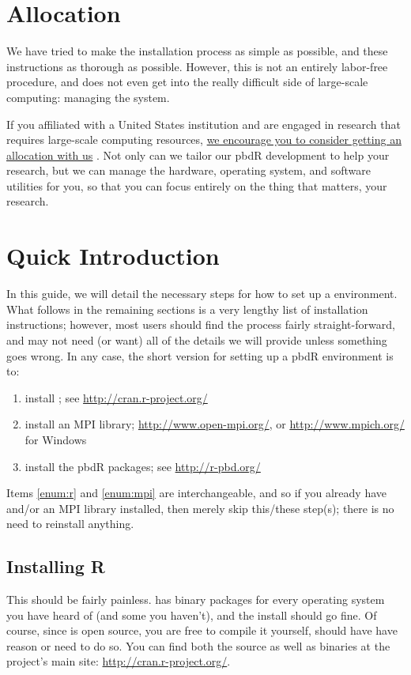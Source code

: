 \section{Allocation}
We have tried to make the installation process as simple as possible, and these instructions as thorough as possible.  However, this is not an entirely labor-free procedure, and does not even get into the really difficult side of large-scale computing:  managing the system.  

If you affiliated with a United States institution and are engaged in research that requires large-scale computing resources, \href{http://www.nics.tennessee.edu/getting-an-allocation}{we encourage you to consider getting an allocation with us} .  Not only can we tailor our pbdR development to help your research, but we can manage the hardware, operating system, and software utilities for you, so that you can focus entirely on the thing that matters, your research.


\section{Quick Introduction}

In this guide, we will detail the necessary steps for how to set up a  environment.  What follows in the remaining sections is a very lengthy list of installation instructions; however, most users should find the process fairly straight-forward, and may not need (or want) all of the details we will provide unless something goes wrong.  In any case, the short version for setting up a pbdR environment is to:
\begin{enumerate}
  \item install  \label{enum:r}; see \url{http://cran.r-project.org/}
  \item install an MPI library\label{enum:mpi}; \url{http://www.open-mpi.org/}, or \url{http://www.mpich.org/} for Windows
  \item install the pbdR packages; see \url{http://r-pbd.org/}
\end{enumerate}

Items \ref{enum:r} and \ref{enum:mpi} are interchangeable, and so if you already have   and/or an MPI library installed, then merely skip this/these step(s); there is no need to reinstall anything.

\subsection{Installing R}
This should be fairly painless.   has binary packages for every operating system you have heard of (and some you haven't), and the install should go fine.  Of course, since  is open source, you are free to compile it yourself, should have have reason or need to do so.  You can find both the source as well as binaries at the  project's main site: \url{http://cran.r-project.org/}.  

